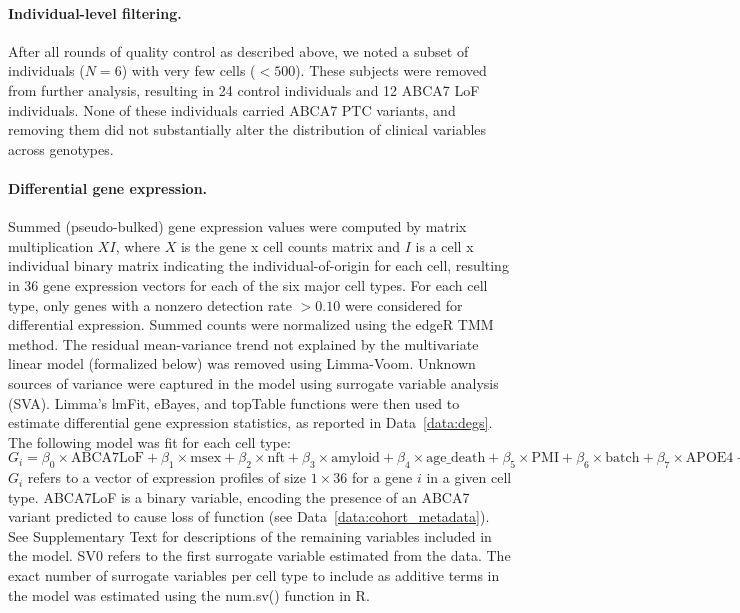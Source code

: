 \paragraph{Individual-level filtering.}
After all rounds of quality control as described above, we noted a subset of individuals ($N=6$) with very few cells ($<500$). These subjects were removed from further analysis, resulting in 24 control individuals and 12 ABCA7 LoF individuals. None of these individuals carried ABCA7 PTC variants, and removing them did not substantially alter the distribution of clinical variables across genotypes.
  
\paragraph{Differential gene expression.}
Summed (pseudo-bulked) gene expression values were computed by matrix multiplication $ X I $, where $ X $ is the gene x cell counts matrix and $ I $ is a cell x individual binary matrix indicating the individual-of-origin for each cell, resulting in 36 gene expression vectors for each of the six major cell types. For each cell type, only genes with a nonzero detection rate $ > 0.10 $ were considered for differential expression. Summed counts were normalized using the edgeR TMM method. The residual mean-variance trend not explained by the multivariate linear model (formalized below) was removed using Limma-Voom. Unknown sources of variance were captured in the model using surrogate variable analysis (SVA). Limma’s lmFit, eBayes, and topTable functions were then used to estimate differential gene expression statistics, as reported in Data~\ref{data:degs}. The following model was fit for each cell type:
$ G_i = \beta_0 \times \text{ABCA7LoF} + \beta_1 \times \text{msex} + \beta_2 \times \text{nft} + \beta_3 \times \text{amyloid} + \beta_4 \times \text{age\_death} + \beta_5 \times \text{PMI} + \beta_6 \times \text{batch} + \beta_7 \times \text{APOE4} + \beta_8 \times \text{SV0} $
$ G_i $ refers to a vector of expression profiles of size $ 1 \times 36 $ for a gene $ i $ in a given cell type. ABCA7LoF is a binary variable, encoding the presence of an ABCA7 variant predicted to cause loss of function (see Data~\ref{data:cohort_metadata}). See Supplementary Text for descriptions of the remaining variables included in the model. SV0 refers to the first surrogate variable estimated from the data. The exact number of surrogate variables per cell type to include as additive terms in the model was estimated using the num.sv() function in R. 

